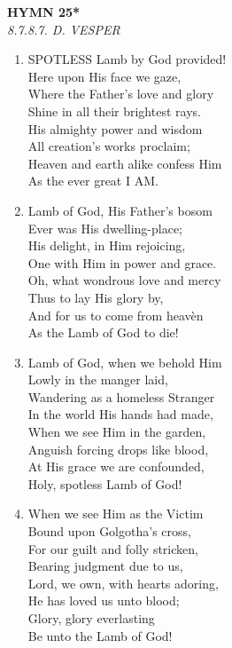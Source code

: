 \newpage
\begin{center}
    {\Large \textbf{HYMN 25*\textdagger{}}}
    \\
    \textit{8.7.8.7. D. VESPER}
\end{center}
\vspace{1em}

\begin{enumerate}
    \item SPOTLESS Lamb by God provided! \\
        Here upon His face we gaze, \\
        Where the Father's love and glory \\
        Shine in all their brightest rays. \\
        His almighty power and wisdom \\
        All creation's works proclaim; \\
        Heaven and earth alike confess Him \\
        As the ever great I AM.

    \item Lamb of God, His Father's bosom \\
        Ever was His dwelling-place; \\
        His delight, in Him rejoicing, \\
        One with Him in power and grace. \\
        Oh, what wondrous love and mercy \\
        Thus to lay His glory by, \\
        And for us to come from heav\`en \\
        As the Lamb of God to die!

    \item Lamb of God, when we behold Him \\
        Lowly in the manger laid, \\
        Wandering as a homeless Stranger \\
        In the world His hands had made, \\
        When we see Him in the garden, \\
        Anguish forcing drops like blood, \\
        At His grace we are confounded, \\
        Holy, spotless Lamb of God!

    \item When we see Him as the Victim \\
        Bound upon Golgotha's cross, \\
        For our guilt and folly stricken, \\
        Bearing judgment due to us, \\
        Lord, we own, with hearts adoring, \\
        He has loved us unto blood; \\
        Glory, glory everlasting \\
        Be unto the Lamb of God!

\end{enumerate}

